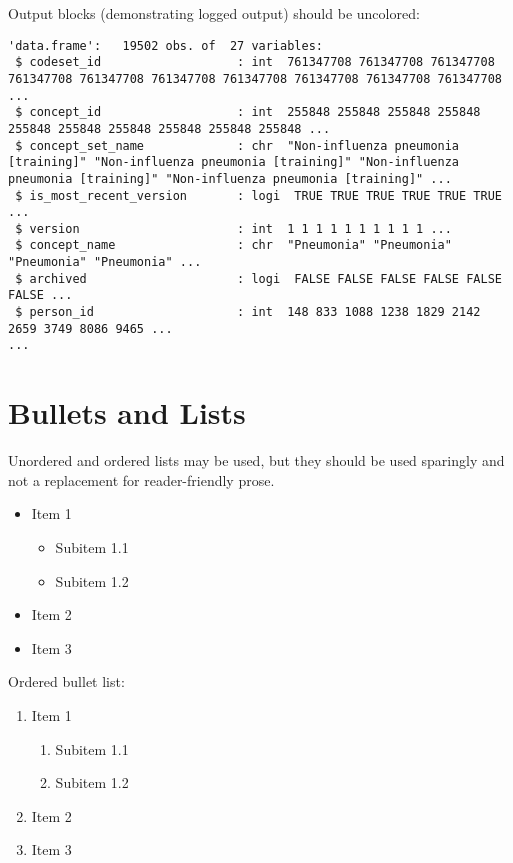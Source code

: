 \documentclass[
]{book}
\providecommand{\tightlist}{%
  \setlength{\itemsep}{0pt}\setlength{\parskip}{0pt}}
\begin{document}
Output blocks (demonstrating logged output) should be uncolored:

\begin{verbatim}
'data.frame':   19502 obs. of  27 variables:
 $ codeset_id                   : int  761347708 761347708 761347708 761347708 761347708 761347708 761347708 761347708 761347708 761347708 ...
 $ concept_id                   : int  255848 255848 255848 255848 255848 255848 255848 255848 255848 255848 ...
 $ concept_set_name             : chr  "Non-influenza pneumonia [training]" "Non-influenza pneumonia [training]" "Non-influenza pneumonia [training]" "Non-influenza pneumonia [training]" ...
 $ is_most_recent_version       : logi  TRUE TRUE TRUE TRUE TRUE TRUE ...
 $ version                      : int  1 1 1 1 1 1 1 1 1 1 ...
 $ concept_name                 : chr  "Pneumonia" "Pneumonia" "Pneumonia" "Pneumonia" ...
 $ archived                     : logi  FALSE FALSE FALSE FALSE FALSE FALSE ...
 $ person_id                    : int  148 833 1088 1238 1829 2142 2659 3749 8086 9465 ...
...
\end{verbatim}

\hypertarget{bullets-and-lists}{%
\section{Bullets and Lists}\label{bullets-and-lists}}

Unordered and ordered lists may be used, but they should be used sparingly and not a replacement for reader-friendly prose.

\begin{itemize}
\tightlist
\item
  Item 1

  \begin{itemize}
  \tightlist
  \item
    Subitem 1.1
  \item
    Subitem 1.2
  \end{itemize}
\item
  Item 2
\item
  Item 3
\end{itemize}

Ordered bullet list:

\begin{enumerate}
\def\labelenumi{\arabic{enumi}.}
\tightlist
\item
  Item 1

  \begin{enumerate}
  \def\labelenumii{\arabic{enumii}.}
  \tightlist
  \item
    Subitem 1.1
  \item
    Subitem 1.2
  \end{enumerate}
\item
  Item 2
\item
  Item 3
\end{enumerate}
\end{document}
